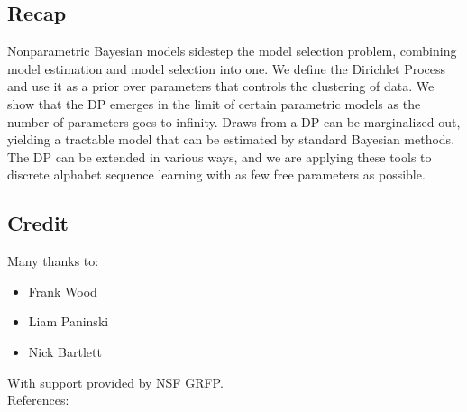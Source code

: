 \documentclass{beamer}
\begin{document}
\subsection{Recap}
\begin{frame}
Nonparametric Bayesian models sidestep the model selection problem, combining model estimation and model selection into one.  We define the Dirichlet Process and use it as a prior over parameters that controls the clustering of data.  We show that the DP emerges in the limit of certain parametric models as the number of parameters goes to infinity.  Draws from a DP can be marginalized out, yielding a tractable model that can be estimated by standard Bayesian methods.  The DP can be extended in various ways, and we are applying these tools to discrete alphabet sequence learning with as few free parameters as possible.
\end{frame}

\subsection{Credit}
\begin{frame}
Many thanks to:
\begin{itemize}
	\item{Frank Wood}
	\item{Liam Paninski}
	\item{Nick Bartlett}
\end{itemize}
With support provided by NSF GRFP.\bigskip\\

References:

 
\end{frame}
\end{document}
